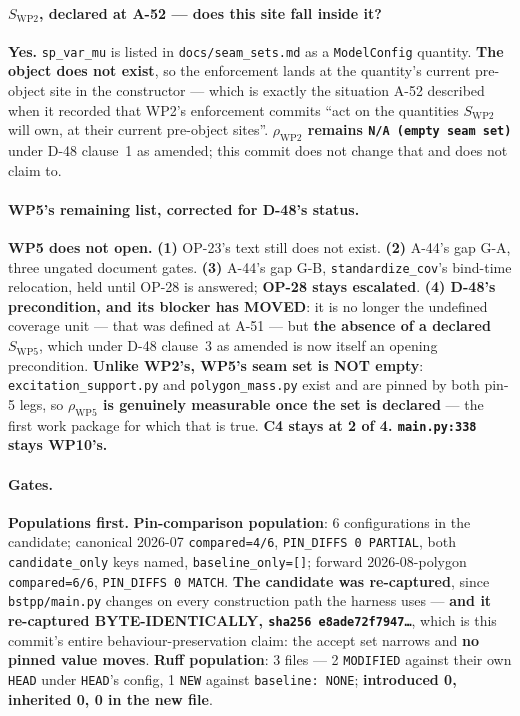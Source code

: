 \documentclass[
  10pt,
]{article}
\begin{document}
\paragraph{$S_{\mathrm{WP2}}$, declared at A-52 --- does this site fall inside it?}
\textbf{Yes.} \texttt{sp\_var\_mu} is listed in \texttt{docs/\allowbreak{}seam\_sets.md} as a \texttt{ModelConfig} quantity. \textbf{The object does not exist}, so the enforcement lands at the quantity's current pre-object site in the constructor --- which is exactly the situation A-52 described when it recorded that WP2's enforcement commits ``act on the quantities $S_{\mathrm{WP2}}$ will own, at their current pre-object sites''. \textbf{$\rho_{\mathrm{WP2}}$ remains \texttt{N/A (empty seam set)}} under D-48 clause~1 as amended; this commit does not change that and does not claim to.

\paragraph{WP5's remaining list, corrected for D-48's status.}
\textbf{WP5 does not open.} \textbf{(1)} OP-23's text still does not exist. \textbf{(2)} A-44's gap G-A, three ungated document gates. \textbf{(3)} A-44's gap G-B, \texttt{standardize\_cov}'s bind-time relocation, held until OP-28 is answered; \textbf{OP-28 stays escalated}. \textbf{(4) D-48's precondition, and its blocker has MOVED}: it is no longer the undefined coverage unit --- that was defined at A-51 --- but \textbf{the absence of a declared $S_{\mathrm{WP5}}$}, which under D-48 clause~3 as amended is now itself an opening precondition. \textbf{Unlike WP2's, WP5's seam set is NOT empty}: \texttt{excitation\_support.py} and \texttt{polygon\_mass.py} exist and are pinned by both pin-5 legs, so \textbf{$\rho_{\mathrm{WP5}}$ is genuinely measurable once the set is declared} --- the first work package for which that is true. \textbf{C4 stays at 2 of 4. \texttt{main.py:338} stays WP10's.}

\paragraph{Gates.}
\textbf{Populations first.} \textbf{Pin-comparison population}: 6 configurations in the candidate; canonical 2026-07 \texttt{compared=4/6}, \texttt{PIN\_DIFFS 0 PARTIAL}, both \texttt{candidate\_only} keys named, \texttt{baseline\_only=[]}; forward 2026-08-polygon \texttt{compared=6/6}, \texttt{PIN\_DIFFS 0 MATCH}. \textbf{The candidate was re-captured}, since \texttt{bstpp/\allowbreak{}main.py} changes on every construction path the harness uses --- \textbf{and it re-captured BYTE-IDENTICALLY, \texttt{sha256 e8ade72f7947\dots}}, which is this commit's entire behaviour-preservation claim: the accept set narrows and \textbf{no pinned value moves}. \textbf{Ruff population}: 3 files --- 2 \texttt{MODIFIED} against their own \texttt{HEAD} under \texttt{HEAD}'s config, 1 \texttt{NEW} against \texttt{baseline: NONE}; \textbf{introduced 0, inherited 0, 0 in the new file}.
\end{document}
